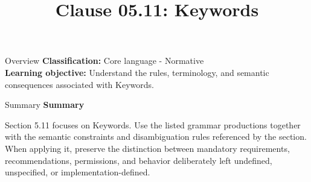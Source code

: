 \documentclass[10pt,letterpaper]{article}
\title{Clause 05.11: Keywords}
\author{}
\date{}
\begin{document}
\maketitle
\begin{CornellOverviewBox}{Overview}
\textbf{Classification:} Core language - Normative\\[2pt]
\textbf{Learning objective:} Understand the rules, terminology, and semantic consequences associated with Keywords.
\end{CornellOverviewBox}\begin{CornellSummaryBox}{Summary}
{\sffamily\bfseries\color{Accent} Summary}\par\vspace{3pt}Section 5.11 focuses on Keywords. Use the listed grammar productions together with the semantic constraints and disambiguation rules referenced by the section. When applying it, preserve the distinction between mandatory requirements, recommendations, permissions, and behavior deliberately left undefined, unspecified, or implementation-defined.
\end{CornellSummaryBox}
\end{document}
